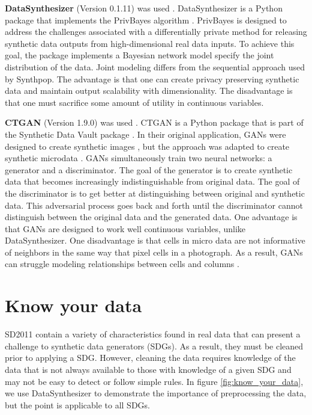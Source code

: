 \documentclass[runningheads]{llncs}
\begin{document}
{\bf DataSynthesizer} (Version 0.1.11) was used \cite{ping2017datasynthesizer}.  DataSynthesizer is a Python package that implements the PrivBayes algorithm \cite{zhang2017privbayes}.  PrivBayes is designed to address the challenges associated with a differentially private method for releasing synthetic data outputs from high-dimensional real data inputs.  To achieve this goal, the package implements a Bayesian network model specify the joint distribution of the data.  Joint modeling differs from the sequential approach used by Synthpop.  The advantage is that one can create privacy preserving synthetic data and maintain output scalability with dimensionality.  The disadvantage is that one must sacrifice some amount of utility in continuous variables.   


{\bf CTGAN} (Version 1.9.0) was used \cite{ctgan}.  CTGAN is a Python package that is part of the Synthetic Data Vault package \cite{patki2016synthetic}.  In their original application, GANs were designed to create synthetic images  \cite{goodfellow2014generative}, but the approach was adapted to create synthetic microdata \cite{park2018data}.  GANs simultaneously train two neural networks: a generator and a discriminator. The goal of the generator is to create synthetic data that becomes increasingly indistinguishable from original data.  The goal of the discriminator is to get better at distinguishing between original and synthetic data.  This adversarial process goes back and forth until the discriminator cannot distinguish between the original data and the generated data.  One advantage is that GANs are designed to work well continuous variables, unlike DataSynthesizer.  One disadvantage is that cells in micro data are not informative of neighbors in the same way that pixel cells in a photograph. As a result, GANs can struggle modeling relationships between cells and columns \cite{drechsler202330}.

\section{Know your data}\label{sec:know_your_data}

SD2011 contain a variety of characteristics found in real data that can present a challenge to synthetic data generators (SDGs).  As a result, they must be cleaned prior to applying a SDG.  However, cleaning the data requires knowledge of the data that is not always available to those with knowledge of a given SDG and may not be easy to detect or follow simple rules.  In figure \ref{fig:know_your_data}, we use DataSynthesizer to demonstrate the importance of preprocessing the data, but the point is applicable to all SDGs.
\end{document}

